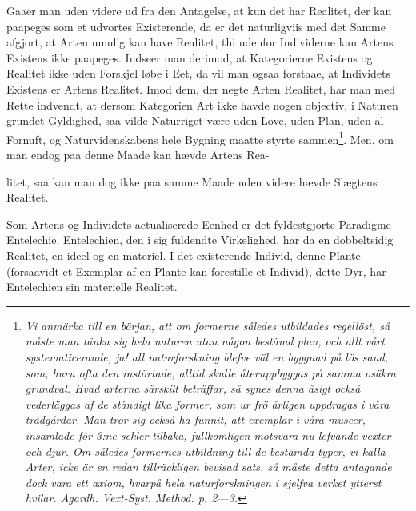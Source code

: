 \documentclass[12pt,a4paper]{book}
\begin{document}
Gaaer man uden videre ud fra den Antagelse, at kun det har Realitet, der
kan paapeges som et udvortes Existerende, da er det naturligviis med det
Samme afgjort, at Arten umulig kan have Realitet, thi udenfor Individerne
kan Artens Existens ikke paapeges. Indseer man derimod, at Kategorierne
Existens og Realitet ikke uden Forskjel løbe i Eet, da vil man ogsaa
forstaae, at Individets Existens er Artens Realitet. Imod dem, der negte
Arten Realitet, har man med Rette indvendt, at dersom Kategorien Art ikke
havde nogen objectiv, i Naturen grundet Gyldighed, saa vilde Naturriget
være uden Love, uden Plan, uden al Fornuft, og Naturvidenskabens hele
Bygning maatte styrte sammen\footnote{\textit{Vi anmärka till en början,
att om formerne således utbildades regellöst, så måste man tänka sig hela
naturen utan någon bestämd plan, och allt vårt systematicerande, ja! all
naturforskning blefve väl en byggnad på lös sand, som, huru ofta den
instörtade, alltid skulle återuppbyggas på samma osäkra grundval. Hvad
arterna särskilt beträffar, så synes denna åsigt också vederläggas af de
ständigt lika former, som ur frö årligen uppdragas i våra trädgårdar. Man
tror sig också ha funnit, att exemplar i våra museer, insamlade för 3:ne
sekler tilbaka, fullkomligen motsvara nu lefvande vexter och djur. Om
således formernes utbildning till de bestämda typer, vi kalla Arter, icke
är en redan tillräckligen bevisad sats, så måste detta antagande dock vara
ett axiom, hvarpå hela naturforskningen i sjelfva verket ytterst hvilar.
Agardh. Vext-Syst. Method. p. 2---3.}}. Men,
om man endog paa denne Maade kan hævde Artens Rea-

litet, saa kan man dog ikke paa samme Maade uden videre hævde Slægtens
Realitet.

Som Artens og Individets actualiserede Eenhed er det fyldestgjorte
Paradigme Entelechie. Entelechien, den i sig fuldendte Virkelighed, har da
en dobbeltsidig Realitet, en ideel og en materiel. I det existerende
Individ, denne Plante (forsaavidt et Exemplar af en Plante kan forestille
et Individ), dette Dyr, har Entelechien sin materielle Realitet.
\end{document}
